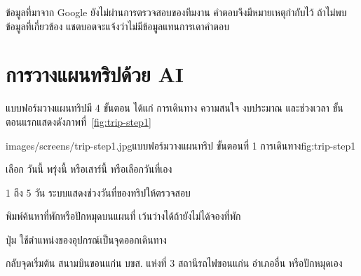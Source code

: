 
\begin{note}
ข้อมูลที่มาจาก Google ยังไม่ผ่านการตรวจสอบของทีมงาน คำตอบจึงมีหมายเหตุกำกับไว้ ถ้าไม่พบข้อมูลที่เกี่ยวข้อง แชตบอตจะแจ้งว่าไม่มีข้อมูลแทนการเดาคำตอบ
\end{note}

\section{การวางแผนทริปด้วย AI}
\label{sec:trip-plan}

แบบฟอร์มวางแผนทริปมี 4 ขั้นตอน ได้แก่ การเดินทาง ความสนใจ งบประมาณ และช่วงเวลา ขั้นตอนแรกแสดงดังภาพที่~\ref{fig:trip-step1}

\begin{screenshot}{images/screens/trip-step1.jpg}{แบบฟอร์มวางแผนทริป ขั้นตอนที่ 1 การเดินทาง}{fig:trip-step1}
\end{screenshot}

\begin{calloutlist}
  \item {} เลือก วันนี้ พรุ่งนี้ หรือเสาร์นี้ หรือเลือกวันที่เอง
  \item {} 1 ถึง 5 วัน ระบบแสดงช่วงวันที่ของทริปให้ตรวจสอบ
  \item {} พิมพ์ค้นหาที่พักหรือปักหมุดบนแผนที่ เว้นว่างได้ถ้ายังไม่ได้จองที่พัก
  \item ปุ่ม  ใช้ตำแหน่งของอุปกรณ์เป็นจุดออกเดินทาง
  \item {} กลับจุดเริ่มต้น สนามบินขอนแก่น บขส. แห่งที่ 3 สถานีรถไฟขอนแก่น อำเภออื่น หรือปักหมุดเอง
\end{calloutlist}

